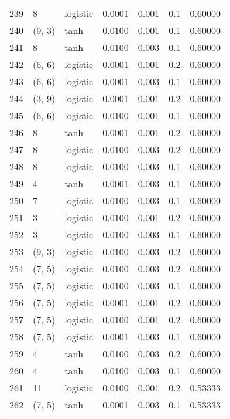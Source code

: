 \begin{tabular}{lllrrrr}
239 &           8 &  logistic &  0.0001 &  0.001 &  0.1 &   0.60000 \\
240 &      (9, 3) &      tanh &  0.0100 &  0.001 &  0.1 &   0.60000 \\
241 &           8 &      tanh &  0.0100 &  0.003 &  0.1 &   0.60000 \\
242 &      (6, 6) &  logistic &  0.0001 &  0.001 &  0.2 &   0.60000 \\
243 &      (6, 6) &  logistic &  0.0001 &  0.003 &  0.1 &   0.60000 \\
244 &      (3, 9) &  logistic &  0.0001 &  0.001 &  0.2 &   0.60000 \\
245 &      (6, 6) &  logistic &  0.0100 &  0.001 &  0.1 &   0.60000 \\
246 &           8 &      tanh &  0.0001 &  0.001 &  0.2 &   0.60000 \\
247 &           8 &  logistic &  0.0100 &  0.003 &  0.2 &   0.60000 \\
248 &           8 &  logistic &  0.0100 &  0.003 &  0.1 &   0.60000 \\
249 &           4 &      tanh &  0.0001 &  0.003 &  0.1 &   0.60000 \\
250 &           7 &  logistic &  0.0100 &  0.003 &  0.1 &   0.60000 \\
251 &           3 &  logistic &  0.0100 &  0.001 &  0.2 &   0.60000 \\
252 &           3 &  logistic &  0.0100 &  0.003 &  0.1 &   0.60000 \\
253 &      (9, 3) &  logistic &  0.0100 &  0.003 &  0.2 &   0.60000 \\
254 &      (7, 5) &  logistic &  0.0100 &  0.003 &  0.2 &   0.60000 \\
255 &      (7, 5) &  logistic &  0.0100 &  0.003 &  0.1 &   0.60000 \\
256 &      (7, 5) &  logistic &  0.0001 &  0.001 &  0.2 &   0.60000 \\
257 &      (7, 5) &  logistic &  0.0100 &  0.001 &  0.2 &   0.60000 \\
258 &      (7, 5) &  logistic &  0.0001 &  0.003 &  0.1 &   0.60000 \\
259 &           4 &      tanh &  0.0100 &  0.003 &  0.2 &   0.60000 \\
260 &           4 &      tanh &  0.0100 &  0.003 &  0.1 &   0.60000 \\
261 &          11 &  logistic &  0.0100 &  0.001 &  0.2 &   0.53333 \\
262 &      (7, 5) &      tanh &  0.0001 &  0.003 &  0.1 &   0.53333 \\

\end{tabular}
